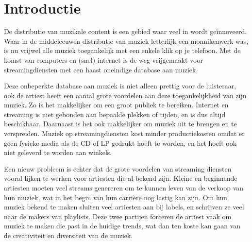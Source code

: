 \section{Introductie}

De distributie van muzikale content is een gebied waar veel in wordt geïnnoveerd. Waar in de middeleeuwen distributie van muziek letterlijk een monnikenwerk was, is nu vrijwel alle muziek toegankelijk met een enkele klik op je telefoon. Met de komst van computers en (snel) internet is de weg vrijgemaakt voor streamingdiensten met een haast oneindige database aan muziek.

Deze onbeperkte database aan muziek is niet alleen prettig voor de luisteraar, ook de artiest heeft een aantal grote voordelen aan deze toegankelijkheid van zijn muziek. Zo is het makkelijker om een groot publiek te bereiken. Internet en streaming is niet gebonden aan bepaalde plekken of tijden, en is dus altijd beschikbaar. Daarnaast is het ook makkelijker om muziek uit te brengen en te verspreiden. Muziek op streamingdiensten kost minder productiekosten omdat er geen fysieke media als de CD of LP gedrukt hoeft te worden, en het hoeft ook niet geleverd te worden aan winkels.

Een nieuw probleem is echter dat de grote voordelen van streaming diensten vooral lijken te werken voor artiesten die al bekend zijn\citep[p.~3607]{hesmondhalgh2021music}. Kleine en beginnende artiesten moeten veel streams genereren om te kunnen leven van de verkoop van hun muziek, wat in het begin van hun carrière nog lastig kan zijn. Om hun muziek bekend te maken sluiten veel artiesten aan bij labels, en schrijven ze veel naar de makers van playlists. Deze twee partijen forceren de artiest vaak om muziek te maken die past in de huidige trends, wat dan ten koste kan gaan van de creativiteit en diversiteit van de muziek.

